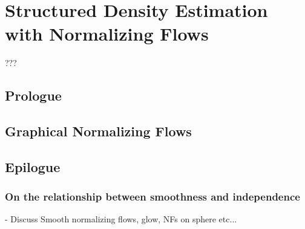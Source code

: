 \chapter{Structured Density Estimation with Normalizing Flows}\label{ch:06}

\begin{chapter_outline}

???
\end{chapter_outline}
\section{Prologue}
\section{Graphical Normalizing Flows}


\section{Epilogue}
\subsection{On the relationship between smoothness and independence}
- Discuss Smooth normalizing flows, glow, NFs on sphere etc...

